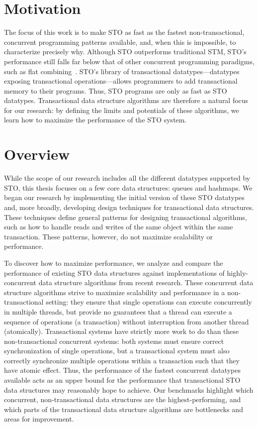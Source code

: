 \section{Motivation}
The focus of this work is to make STO as fast as the fastest non-transactional, concurrent programming patterns available, and, when this is impossible, to characterize precisely why. Although STO outperforms traditional STM, STO’s performance still falls far below that of other concurrent programming paradigms, such as flat combining~\cite{flatcombining}. STO’s library of transactional datatypes---datatypes exposing transactional operations---allows programmers to add transactional memory to their programs. Thus, STO programs are only as fast as STO datatypes. Transactional data structure algorithms are therefore a natural focus for our research: by defining the limits and potentials of these algorithms, we learn how to maximize the performance of the STO system.

\section{Overview}
While the scope of our research includes all the different datatypes supported by STO, this thesis focuses on a few core data structures: queues and hashmaps. We began our research by implementing the initial version of these STO datatypes and, more broadly, developing design techniques for transactional data structures. These techniques define general patterns for designing transactional algorithms, such as how to handle reads and writes of the same object within the same transaction. These patterns, however, do not maximize scalability or performance.

To discover how to maximize performance, we analyze and compare the performance of existing STO data structures against implementations of highly-concurrent data structure algorithms from recent research. These concurrent data structure algorithms strive to maximize scalability and performance in a non-transactional setting: they ensure that single operations can execute concurrently in multiple threads, but provide no guarantees that a thread can execute a sequence of operations (a transaction) without interruption from another thread (atomically).
Transactional systems have strictly more work to do than these non-transactional concurrent systems: both systems must ensure correct synchronization of single operations, but a transactional system must also correctly synchronize multiple operations within a transaction such that they have atomic effect.
Thus, the performance of the fastest concurrent datatypes available acts as an upper bound for the performance that transactional STO data structures may reasonably hope to achieve. Our benchmarks highlight which concurrent, non-transactional data structures are the highest-performing, and which parts of the transactional data structure algorithms are bottlenecks and areas for improvement. 

